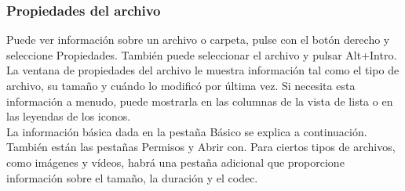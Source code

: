 \subsubsection{Propiedades del archivo}
Puede ver información sobre un archivo o carpeta, pulse con el botón derecho y seleccione Propiedades. También puede seleccionar el archivo y pulsar Alt+Intro.\\

La ventana de propiedades del archivo le muestra información tal como el tipo de archivo, su tamaño y cuándo lo modificó por última vez. Si necesita esta información a menudo, puede mostrarla en las columnas de la vista de lista o en las leyendas de los iconos.\\
La información básica dada en la pestaña Básico se explica a continuación. También están las pestañas Permisos y Abrir con. Para ciertos tipos de archivos, como imágenes y vídeos, habrá una pestaña adicional que proporcione información sobre el tamaño, la duración y el codec.\\


